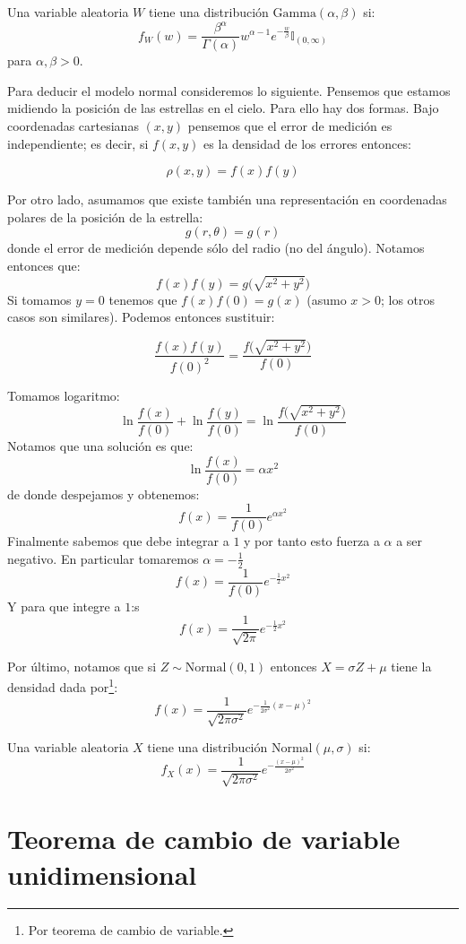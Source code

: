 \documentclass[
]{book}
\begin{document}
Una variable aleatoria \(W\) tiene una distribución \(\text{Gamma}(\alpha,\beta)\) si:
\[
f_W(w) =  \dfrac{\beta^{\alpha} }{\Gamma (\alpha)} w^{\alpha - 1} e^{- \frac{w}{\beta}} \mathbb{I}_{(0,\infty)}
\]
para \(\alpha,\beta > 0\).

Para deducir el modelo normal consideremos lo siguiente. Pensemos que estamos midiendo la posición de las estrellas en el cielo. Para ello hay dos formas. Bajo coordenadas cartesianas \((x,y)\) pensemos que el error de medición es independiente; es decir, si \(f(x,y)\) es la densidad de los errores entonces:

\[
\rho (x,y) = f(x) f(y) 
\]

Por otro lado, asumamos que existe también una representación en coordenadas polares de la posición de la estrella:
\[
g (r, \theta)  = g(r) 
\]
donde el error de medición depende sólo del radio (no del ángulo). Notamos entonces que:
\[
f(x) f(y) = g\Big( \sqrt{x^2 + y^2} \Big) 
\]
Si tomamos \(y = 0\) tenemos que \(f(x) f(0) = g(x)\) (asumo \(x > 0\); los otros casos son similares). Podemos entonces sustituir:

\[
\dfrac{f(x) f(y)}{f(0)^2} = \dfrac{f\Big( \sqrt{x^2 + y^2} \Big) }{f(0)}
\]

Tomamos logaritmo:
\[
\ln \dfrac{f(x)}{f(0)} + \ln \dfrac{f(y)}{f(0)}  = \ln \dfrac{f\Big( \sqrt{x^2 + y^2} \Big) }{f(0)}
\]
Notamos que una solución es que:
\[
\ln \dfrac{f(x)}{f(0)} = \alpha x^2
\]
de donde despejamos y obtenemos:
\[
f(x) = \frac{1}{f(0)} e^{\alpha x^2}
\]
Finalmente sabemos que debe integrar a \(1\) y por tanto esto fuerza a \(\alpha\) a ser negativo. En particular tomaremos \(\alpha = -\frac{1}{2}\)
\[
f(x) = \frac{1}{f(0)} e^{-\frac{1}{2} x^2}
\]
Y para que integre a \(1\):s
\[
f(x) = \frac{1}{\sqrt{2 \pi}} e^{-\frac{1}{2} x^2}
\]

Por último, notamos que si \(Z\sim \textrm{Normal}(0,1)\) entonces \(X = \sigma Z + \mu\) tiene la densidad dada por\footnote{Por teorema de cambio de variable.}:
\[
f(x) = \frac{1}{\sqrt{2 \pi \sigma^2}} e^{-\frac{1}{2\sigma^2} (x - \mu)^2}
\]

Una variable aleatoria \(X\) tiene una distribución \(\text{Normal}(\mu,\sigma)\) si:
\[
f_X(x) =  \frac{1}{\sqrt{2 \pi \sigma^2}} e^{-\frac{(x - \mu)^2}{2 \sigma^2}} 
\]

\hypertarget{teorema-de-cambio-de-variable-unidimensional}{%
\section{Teorema de cambio de variable unidimensional}\label{teorema-de-cambio-de-variable-unidimensional}}
\end{document}
